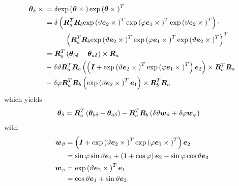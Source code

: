 \documentclass[10pt,dvips,fleqn,subeqn]{report}
\newcommand{\T}[1]{\boldsymbol{#1}}
\begin{document}
\begin{align}
	\T{\theta}_{\delta}\times{}
	&= \delta \llk{exp}\plbr{\T{\theta}\times{}}
		\llk{exp}\plbr{\T{\theta}\times{}}^T \\
	&= \delta \plbr{
		\T{R}_a^T
		\T{R}_b
		\llk{exp}\plbr{\vartheta \T{e}_2\times{}}^T
		\llk{exp}\plbr{\varphi \T{e}_1\times{}}^T
		\llk{exp}\plbr{\vartheta \T{e}_2\times{}}^T
	} \cdot \nonumber \\
	&\mbox{\hspace{10mm}} \plbr{
		\T{R}_a^T
		\T{R}_b
		\llk{exp}\plbr{\vartheta \T{e}_2\times{}}^T
		\llk{exp}\plbr{\varphi \T{e}_1\times{}}^T
		\llk{exp}\plbr{\vartheta \T{e}_2\times{}}^T
	}^T \\
	&= \T{R}_a^T
	\plbr{\T{\theta}_{b\delta} - \T{\theta}_{a\delta}}\times{} \T{R}_a
	\nonumber \\
	& \mbox{} -
	\delta\vartheta \T{R}_a^T \T{R}_b \plbr{
		\plbr{
			\T{I}
			+ \llk{exp}\plbr{\vartheta \T{e}_2\times{}}^T
			\llk{exp}\plbr{\varphi \T{e}_1\times{}}^T
		} \T{e}_2
	}\times \T{R}_b^T \T{R}_a
	\nonumber \\
	& \mbox{} -
	\delta\varphi \T{R}_a^T \T{R}_b \plbr{
		\llk{exp}\plbr{\vartheta \T{e}_2\times{}}^T \T{e}_1
	} \times \T{R}_b^T \T{R}_a
\end{align}
which yields
\begin{align}
	\T{\theta}_{\delta}
	&= \T{R}_a^T \plbr{\T{\theta}_{b\delta} - \T{\theta}_{a\delta}}
	- \T{R}_a^T \T{R}_b \plbr{
		\delta\vartheta \T{w}_{\vartheta}
		+ \delta\varphi \T{w}_{\varphi}
	}
\end{align}
with
\begin{align}
	\T{w}_{\vartheta}
	&= \plbr{
		\T{I}
		+ \llk{exp}\plbr{\vartheta \T{e}_2\times{}}^T
		\llk{exp}\plbr{\varphi \T{e}_1\times{}}^T
	} \T{e}_2
	\nonumber \\
	&= \sin\varphi \sin\vartheta \T{e}_1
	+ \plbr{1 + \cos\varphi} \T{e}_2
	- \sin\varphi \cos\vartheta \T{e}_3 \\
	\T{w}_{\varphi}
	&= \llk{exp}\plbr{\vartheta \T{e}_2\times{}}^T \T{e}_1
	\nonumber \\
	&= \cos\vartheta \T{e}_1 + \sin\vartheta \T{e}_3 .
\end{align}
\end{document}
